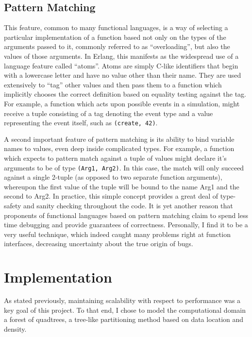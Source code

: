 \documentclass[twocolumn,a4paper,10pt]{article}
\begin{document}
\subsection{Pattern Matching}

This feature, common to many functional languages, is a way of selecting a
particular implementation of a function based not only on the types of the
arguments passed to it, commonly referred to as ``overloading'', but also the
values of those arguments. In Erlang, this manifests as the widespread use of a
language feature called ``atoms''. Atoms are simply C-like identifiers that
begin with a lowercase letter and have no value other than their name. They are
used extensively to ``tag'' other values and then pass them to a function which
implicitly chooses the correct  definition based on equality testing against the
tag.
For example, a function which acts upon possible events in a simulation,
might receive a tuple consisting of a tag denoting the event type and a value
representing the event itself, such as \texttt{(create, 42)}.

A second important feature of pattern matching is its ability to bind variable
names to values, even deep inside complicated types. For example, a function
which expects to pattern match against a tuple of values might declare it's
arguments to be of type \texttt{(Arg1, Arg2)}. In this case, the match will only
succeed against a single 2-tuple (as opposed to two separate function arguments),
whereupon the first value of the tuple will be bound to the name Arg1 and the
second to Arg2. In practice, this simple concept provides a great deal of
type-safety and sanity checking throughout the code. It is yet another reason
that proponents of functional languages based on pattern matching claim to spend
less time debugging and provide guarantees of correctness. Personally, I find it
to be a very useful technique, which indeed caught many problems right at
function interfaces, decreasing uncertainty about the true origin of bugs.

\section{Implementation}


As stated previously, maintaining scalability with respect to performance was a
key goal of this project. To that end, I chose to model the computational domain
a forest of quadtrees, a tree-like partitioning method based on data
location and density.
\end{document}
